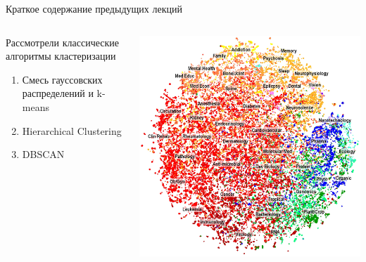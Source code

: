 \documentclass[10pt]{beamer}
\begin{document}
\begin{frame}{Краткое содержание предыдущих лекций}

\begin{columns}[C]
    \begin{column}{.4\textwidth}
    	Рассмотрели классические алгоритмы кластеризации
		\begin{enumerate}
			\item Смесь гауссовских распределений и k-means
			\item Hierarchical Clustering
			\item DBSCAN
		\end{enumerate}    	
    \end{column}
       
    \begin{column}{.6\textwidth}
    \vspace{-0em}
	\begin{center}
   		\includegraphics[width=\textwidth]{images/medical.png}
    \end{center}
    \end{column}
  \end{columns}

\end{frame}

\end{document}
